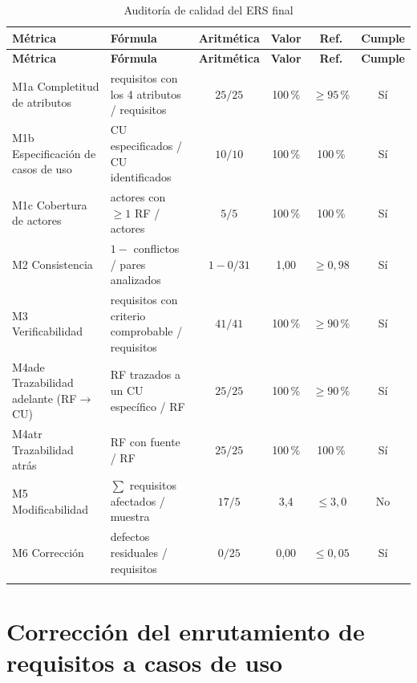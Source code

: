 \begin{longtable}{|p{3.4cm}|p{3.2cm}|c|c|c|c|}
\hline
\textbf{Métrica} &
\textbf{Fórmula} &
\textbf{Aritmética} &
\textbf{Valor} &
\textbf{Ref.} &
\textbf{Cumple} \\ \hline
\endfirsthead

\hline
\textbf{Métrica} &
\textbf{Fórmula} &
\textbf{Aritmética} &
\textbf{Valor} &
\textbf{Ref.} &
\textbf{Cumple} \\ \hline
\endhead

M1a Completitud de atributos &
requisitos con los 4 atributos / requisitos &
$25/25$ &
100\,\% &
$\geq 95\,\%$ &
Sí \\ \hline

M1b Especificación de casos de uso &
CU especificados / CU identificados &
$10/10$ &
100\,\% &
100\,\% &
Sí \\ \hline

M1c Cobertura de actores &
actores con $\geq 1$ RF / actores &
$5/5$ &
100\,\% &
100\,\% &
Sí \\ \hline

M2 Consistencia &
$1-$ conflictos / pares analizados &
$1-0/31$ &
1,00 &
$\geq 0{,}98$ &
Sí \\ \hline

M3 Verificabilidad &
requisitos con criterio comprobable / requisitos &
$41/41$ &
100\,\% &
$\geq 90\,\%$ &
Sí \\ \hline

M4ade Trazabilidad adelante (RF$\to$CU) &
RF trazados a un CU específico / RF &
$25/25$ &
100\,\% &
$\geq 90\,\%$ &
Sí \\ \hline

M4atr Trazabilidad atrás &
RF con fuente / RF &
$25/25$ &
100\,\% &
100\,\% &
Sí \\ \hline

M5 Modificabilidad &
$\sum$ requisitos afectados / muestra &
$17/5$ &
3,4 &
$\leq 3{,}0$ &
No \\ \hline

M6 Corrección &
defectos residuales / requisitos &
$0/25$ &
0,00 &
$\leq 0{,}05$ &
Sí \\ \hline

\caption{Auditoría de calidad del ERS final}
\label{tab:auditoria}
\end{longtable}

\section{Corrección del enrutamiento de requisitos a casos de uso}

